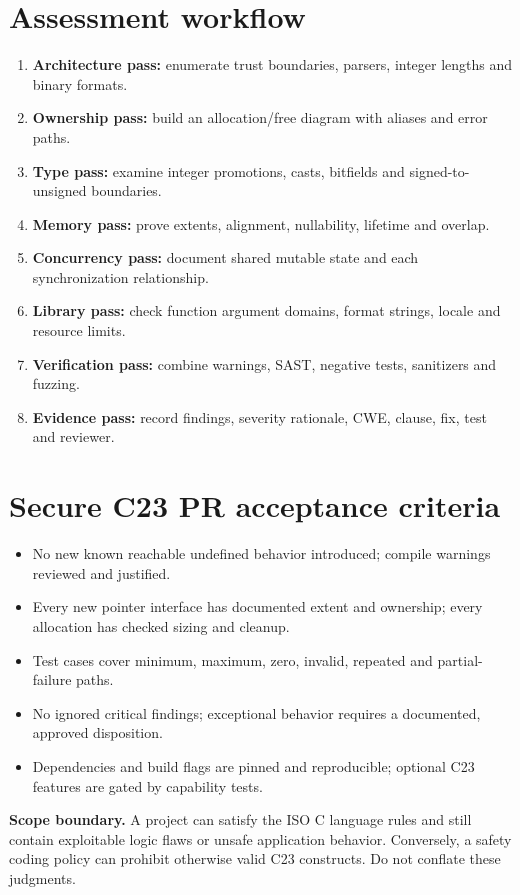 \documentclass[10pt,letterpaper,oneside]{report}
\begin{document}
\chapter{Assessment workflow}
\begin{enumerate}
\item \textbf{Architecture pass:} enumerate trust boundaries, parsers, integer lengths and binary formats.
\item \textbf{Ownership pass:} build an allocation/free diagram with aliases and error paths.
\item \textbf{Type pass:} examine integer promotions, casts, bitfields and signed-to-unsigned boundaries.
\item \textbf{Memory pass:} prove extents, alignment, nullability, lifetime and overlap.
\item \textbf{Concurrency pass:} document shared mutable state and each synchronization relationship.
\item \textbf{Library pass:} check function argument domains, format strings, locale and resource limits.
\item \textbf{Verification pass:} combine warnings, SAST, negative tests, sanitizers and fuzzing.
\item \textbf{Evidence pass:} record findings, severity rationale, CWE, clause, fix, test and reviewer.
\end{enumerate}
\chapter{Secure C23 PR acceptance criteria}
\begin{itemize}
\item No new known reachable undefined behavior introduced; compile warnings reviewed and justified.
\item Every new pointer interface has documented extent and ownership; every allocation has checked sizing and cleanup.
\item Test cases cover minimum, maximum, zero, invalid, repeated and partial-failure paths.
\item No ignored critical findings; exceptional behavior requires a documented, approved disposition.
\item Dependencies and build flags are pinned and reproducible; optional C23 features are gated by capability tests.
\end{itemize}
\begin{warnbox}\textbf{Scope boundary.} A project can satisfy the ISO C language rules and still contain exploitable logic flaws or unsafe application behavior. Conversely, a safety coding policy can prohibit otherwise valid C23 constructs. Do not conflate these judgments.\end{warnbox}
\end{document}
